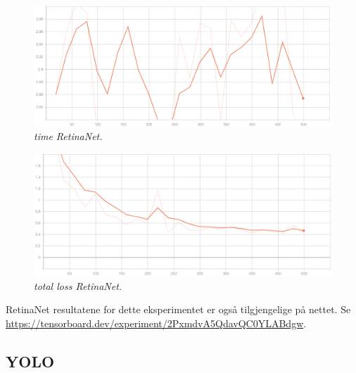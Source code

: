 \begin{figure}[h!]
\begin{center} 
\includegraphics[scale=0.35]{figures/time_retinanet_7}
\caption{\small \sl time RetinaNet. \label{fig:time_retinanet}}
\end{center}
\end{figure}

\begin{figure}[h!]
\begin{center} 
\includegraphics[scale=0.35]{figures/total_loss_retinanet_8}
\caption{\small \sl total loss RetinaNet. \label{fig:total_loss_retinanet}}
\end{center}
\end{figure}

RetinaNet resultatene for dette eksperimentet er også tilgjengelige på nettet. Se \\ \url{https://tensorboard.dev/experiment/2PxmdvA5QdavQC0YLABdgw}.

\subsection{YOLO}